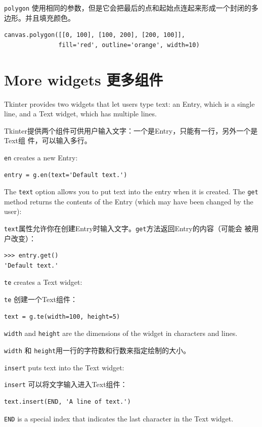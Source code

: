 \documentclass[10pt]{book}
\begin{document}
\begin{CJK}{UTF8}{gbsn}
{\tt polygon} 使用相同的参数，但是它会把最后的点和起始点连起来形成一个封闭的多
边形。并且填充颜色。

\begin{verbatim}
canvas.polygon([[0, 100], [100, 200], [200, 100]],
               fill='red', outline='orange', width=10)
\end{verbatim}
%


\section{More widgets 更多组件}

Tkinter provides two widgets that let users type text: an
Entry, which is a single line, and a Text widget, which has
multiple lines.

Tkinter提供两个组件可供用户输入文字：一个是Entry，只能有一行，另外一个是Text组
件，可以输入多行。

{\tt en} creates a new Entry:

\begin{verbatim}
entry = g.en(text='Default text.')
\end{verbatim}
%
The {\tt text} option allows you to put text into the entry
when it is created.  The {\tt get} method returns the contents
of the Entry (which may have been changed by the user):

{\tt text}属性允许你在创建Entry时输入文字。{\tt get}方法返回Entry的内容（可能会
被用户改变）：

\begin{verbatim}
>>> entry.get()
'Default text.'
\end{verbatim}
%
{\tt te} creates a Text widget:

{\tt te} 创建一个Text组件：

\begin{verbatim}
text = g.te(width=100, height=5)
\end{verbatim}
%
{\tt width} and {\tt height} are the dimensions of the
widget in characters and lines.

{\tt width} 和 {\tt height}用一行的字符数和行数来指定绘制的大小。

{\tt insert} puts text into the Text widget:

{\tt insert} 可以将文字输入进入Text组件：

\begin{verbatim}
text.insert(END, 'A line of text.')
\end{verbatim}
%
{\tt END} is a special index that indicates the last character in the
Text widget.


\end{CJK}
\end{document}
